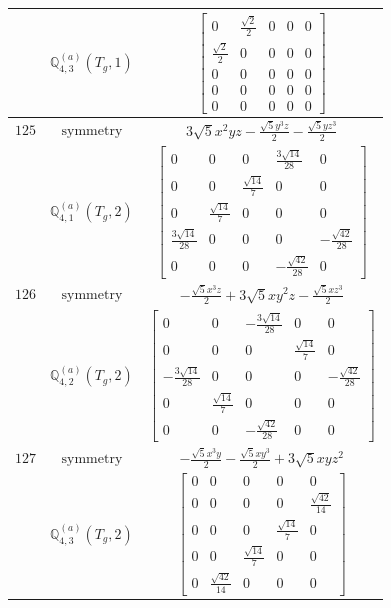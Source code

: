 \documentclass[fleqn,8pt,landscape]{jsarticle}
\begin{document}
\begin{longtable}{ccc}
$  $ & $ \mathbb{Q}_{4,3}^{(a)}(T_{g},1) $ & $ \begin{bmatrix} 0 & \frac{\sqrt{2}}{2} & 0 & 0 & 0 \\ \frac{\sqrt{2}}{2} & 0 & 0 & 0 & 0 \\ 0 & 0 & 0 & 0 & 0 \\ 0 & 0 & 0 & 0 & 0 \\ 0 & 0 & 0 & 0 & 0 \end{bmatrix} $ \\ \hline
$ 125 $ & $ \text{symmetry} $ & $ 3 \sqrt{5} x^{2} y z - \frac{\sqrt{5} y^{3} z}{2} - \frac{\sqrt{5} y z^{3}}{2} $ \\
$  $ & $ \mathbb{Q}_{4,1}^{(a)}(T_{g},2) $ & $ \begin{bmatrix} 0 & 0 & 0 & \frac{3 \sqrt{14}}{28} & 0 \\ 0 & 0 & \frac{\sqrt{14}}{7} & 0 & 0 \\ 0 & \frac{\sqrt{14}}{7} & 0 & 0 & 0 \\ \frac{3 \sqrt{14}}{28} & 0 & 0 & 0 & - \frac{\sqrt{42}}{28} \\ 0 & 0 & 0 & - \frac{\sqrt{42}}{28} & 0 \end{bmatrix} $ \\ \hline
$ 126 $ & $ \text{symmetry} $ & $ - \frac{\sqrt{5} x^{3} z}{2} + 3 \sqrt{5} x y^{2} z - \frac{\sqrt{5} x z^{3}}{2} $ \\
$  $ & $ \mathbb{Q}_{4,2}^{(a)}(T_{g},2) $ & $ \begin{bmatrix} 0 & 0 & - \frac{3 \sqrt{14}}{28} & 0 & 0 \\ 0 & 0 & 0 & \frac{\sqrt{14}}{7} & 0 \\ - \frac{3 \sqrt{14}}{28} & 0 & 0 & 0 & - \frac{\sqrt{42}}{28} \\ 0 & \frac{\sqrt{14}}{7} & 0 & 0 & 0 \\ 0 & 0 & - \frac{\sqrt{42}}{28} & 0 & 0 \end{bmatrix} $ \\ \hline
$ 127 $ & $ \text{symmetry} $ & $ - \frac{\sqrt{5} x^{3} y}{2} - \frac{\sqrt{5} x y^{3}}{2} + 3 \sqrt{5} x y z^{2} $ \\
$  $ & $ \mathbb{Q}_{4,3}^{(a)}(T_{g},2) $ & $ \begin{bmatrix} 0 & 0 & 0 & 0 & 0 \\ 0 & 0 & 0 & 0 & \frac{\sqrt{42}}{14} \\ 0 & 0 & 0 & \frac{\sqrt{14}}{7} & 0 \\ 0 & 0 & \frac{\sqrt{14}}{7} & 0 & 0 \\ 0 & \frac{\sqrt{42}}{14} & 0 & 0 & 0 \end{bmatrix} $ \\ \hline

\end{longtable}
\end{document}
